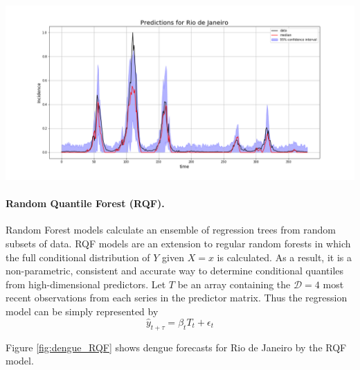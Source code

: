 \documentclass[a0,portrait]{a0poster}
\begin{document}
\begin{multicols}{3}
\begin{center}\vspace{1cm} 
    \includegraphics[width=\linewidth]{figures/LSTM_dropout.png}
    \label{fig:dengue_LSTM}
\end{center}%

\paragraph*{Random Quantile Forest (RQF).}
Random Forest models calculate an ensemble of regression trees from random 
subsets of data. RQF models are an extension to regular random forests in which 
the full conditional distribution of $Y$ given $X=x$ is calculated. As a 
result, it is a non-parametric, consistent and accurate way to determine 
conditional quantiles from high-dimensional 
predictors\cite{meinshausen2006quantile}. Let $T$ be an array containing the 
${\mathcal D=4}$ most recent observations from each 
series in the predictor matrix. Thus the regression model can be simply 
represented by
\begin{equation}
\hat{y}_{t+\tau} = \beta_{t} T_{t} + \epsilon_t
\label{eq:rf_trans}
\end{equation} 

Figure \ref{fig:dengue_RQF} shows dengue forecasts for Rio de Janeiro by the 
RQF model.


\end{multicols}
\end{document}
